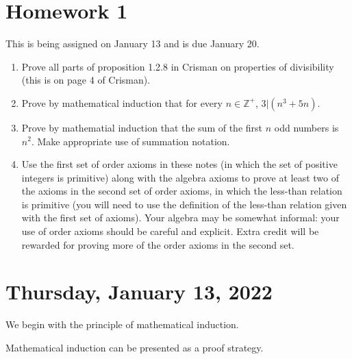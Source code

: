 \documentclass[12pt]{article}
\begin{document}
\newpage

\section{Homework 1}

This is being assigned on January 13 and is due January 20.

\begin{enumerate}

\item  Prove all parts of proposition 1.2.8 in Crisman on properties of divisibility (this is on page 4 of Crisman).

\item  Prove by mathematical induction that for every $n \in {\mathbb Z}^+$, $3|(n^3+5n)$.

\item  Prove by mathematial induction that the sum of the first $n$ odd numbers is $n^2$.  Make appropriate use of summation notation.

\item Use the first set of order axioms in these notes (in which the set of positive integers is primitive) along with the algebra axioms to prove at least two of the axioms in the second set of order axioms, in which the less-than relation is primitive (you will need to use the definition of the less-than relation given with the first set of axioms).  Your algebra may be somewhat informal:  your use of order axioms should be careful and explicit.  Extra credit will be rewarded for proving more of the order axioms in the second set.

\end{enumerate}

\newpage

\section{Thursday, January 13, 2022}

We begin with the principle of mathematical induction.

Mathematical induction can be presented as a proof strategy.
\end{document}
